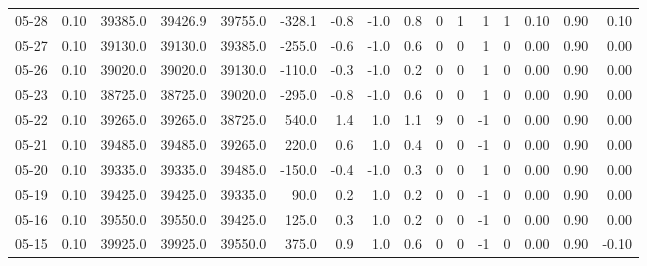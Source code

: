 \begin{threeparttable}
{\begin{tabular}{lrrrrrrrrrrrrrrr}
  05-28 &     0.10 & 39385.0 & 39426.9 & 39755.0 &     -328.1 &           -0.8 &                     -1.0 &                 0.8 &              0 &         1 &     1 &         1 &       0.10 &      0.90 &           0.10 \\
  05-27 &     0.10 & 39130.0 & 39130.0 & 39385.0 &     -255.0 &           -0.6 &                     -1.0 &                 0.6 &              0 &         0 &     1 &         0 &       0.00 &      0.90 &           0.00 \\
  05-26 &     0.10 & 39020.0 & 39020.0 & 39130.0 &     -110.0 &           -0.3 &                     -1.0 &                 0.2 &              0 &         0 &     1 &         0 &       0.00 &      0.90 &           0.00 \\
  05-23 &     0.10 & 38725.0 & 38725.0 & 39020.0 &     -295.0 &           -0.8 &                     -1.0 &                 0.6 &              0 &         0 &     1 &         0 &       0.00 &      0.90 &           0.00 \\
  05-22 &     0.10 & 39265.0 & 39265.0 & 38725.0 &      540.0 &            1.4 &                      1.0 &                 1.1 &              9 &         0 &    -1 &         0 &       0.00 &      0.90 &           0.00 \\
  05-21 &     0.10 & 39485.0 & 39485.0 & 39265.0 &      220.0 &            0.6 &                      1.0 &                 0.4 &              0 &         0 &    -1 &         0 &       0.00 &      0.90 &           0.00 \\
  05-20 &     0.10 & 39335.0 & 39335.0 & 39485.0 &     -150.0 &           -0.4 &                     -1.0 &                 0.3 &              0 &         0 &     1 &         0 &       0.00 &      0.90 &           0.00 \\
  05-19 &     0.10 & 39425.0 & 39425.0 & 39335.0 &       90.0 &            0.2 &                      1.0 &                 0.2 &              0 &         0 &    -1 &         0 &       0.00 &      0.90 &           0.00 \\
  05-16 &     0.10 & 39550.0 & 39550.0 & 39425.0 &      125.0 &            0.3 &                      1.0 &                 0.2 &              0 &         0 &    -1 &         0 &       0.00 &      0.90 &           0.00 \\
  05-15 &     0.10 & 39925.0 & 39925.0 & 39550.0 &      375.0 &            0.9 &                      1.0 &                 0.6 &              0 &         0 &    -1 &         0 &       0.00 &      0.90 &          -0.10 \\

\end{tabular}}
\end{threeparttable}

